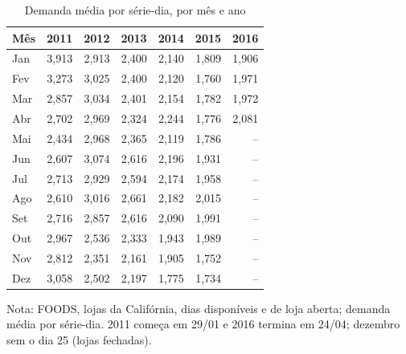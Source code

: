 \begin{table}[htbp]
\centering
\small
\caption{Demanda média por série-dia, por mês e ano}
\label{tab:saz_mensal_por_ano}
\begin{tabular}{lrrrrrr}
\toprule
Mês & 2011 & 2012 & 2013 & 2014 & 2015 & 2016 \\
\midrule
Jan & 3,913 & 2,913 & 2,400 & 2,140 & 1,809 & 1,906 \\
Fev & 3,273 & 3,025 & 2,400 & 2,120 & 1,760 & 1,971 \\
Mar & 2,857 & 3,034 & 2,401 & 2,154 & 1,782 & 1,972 \\
Abr & 2,702 & 2,969 & 2,324 & 2,244 & 1,776 & 2,081 \\
Mai & 2,434 & 2,968 & 2,365 & 2,119 & 1,786 & -- \\
Jun & 2,607 & 3,074 & 2,616 & 2,196 & 1,931 & -- \\
Jul & 2,713 & 2,929 & 2,594 & 2,174 & 1,958 & -- \\
Ago & 2,610 & 3,016 & 2,661 & 2,182 & 2,015 & -- \\
Set & 2,716 & 2,857 & 2,616 & 2,090 & 1,991 & -- \\
Out & 2,967 & 2,536 & 2,333 & 1,943 & 1,989 & -- \\
Nov & 2,812 & 2,351 & 2,161 & 1,905 & 1,752 & -- \\
Dez & 3,058 & 2,502 & 2,197 & 1,775 & 1,734 & -- \\
\bottomrule
\end{tabular}
\par\smallskip
{\footnotesize Nota: FOODS, lojas da Califórnia, dias disponíveis e de loja aberta; demanda média por série-dia. 2011 começa em 29/01 e 2016 termina em 24/04; dezembro sem o dia 25 (lojas fechadas).}
\end{table}
